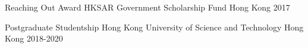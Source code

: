






\begin{cvhonors}


\cvhonor
{Reaching Out Award} %
{HKSAR Government Scholarship Fund} %
{Hong Kong} %
{2017} %


\cvhonor
{Postgraduate Studentship} %
{Hong Kong University of Science and Technology} %
{Hong Kong} %
{2018-2020} %




\end{cvhonors}